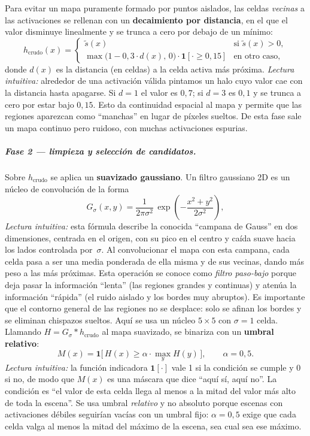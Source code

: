 \documentclass[11pt,fleqn,openany]{book} %
\begin{document}
Para evitar un mapa puramente formado por puntos aislados, las celdas \emph{vecinas} a las activaciones se rellenan con un \textbf{decaimiento por distancia}, en el que el valor disminuye linealmente y se trunca a cero por debajo de un mínimo:
%
\begin{equation}
h_{\text{crudo}}(x) =
\begin{cases}
\tilde s(x) & \text{si } \tilde s(x) > 0,\\
\max\bigl(1 - 0{,}3 \cdot d(x),\,0\bigr) \cdot \mathbf{1}[\cdot \geq 0{,}15] & \text{en otro caso,}
\end{cases}
\label{eq:dist_decay}
\end{equation}
%
donde $d(x)$ es la distancia (en celdas) a la celda activa más próxima. \emph{Lectura intuitiva:} alrededor de una activación válida pintamos un halo cuyo valor cae con la distancia hasta apagarse. Si $d=1$ el valor es $0{,}7$; si $d=3$ es $0{,}1$ y se trunca a cero por estar bajo $0{,}15$. Esto da continuidad espacial al mapa y permite que las regiones aparezcan como ``manchas'' en lugar de píxeles sueltos. De esta fase sale un mapa continuo pero ruidoso, con muchas activaciones espurias.

\subparagraph{Fase 2 — limpieza y selección de candidatos.} Sobre $h_{\text{crudo}}$ se aplica un \textbf{suavizado gaussiano}. Un filtro gaussiano 2D es un núcleo de convolución de la forma
%
\begin{equation}
G_\sigma(x,y) = \frac{1}{2\pi\sigma^{2}}\,
\exp\!\left(-\frac{x^{2}+y^{2}}{2\sigma^{2}}\right),
\label{eq:gauss}
\end{equation}
%
\emph{Lectura intuitiva:} esta fórmula describe la conocida ``campana de Gauss'' en dos dimensiones, centrada en el origen, con su pico en el centro y caída suave hacia los lados controlada por~$\sigma$. Al convolucionar el mapa con esta campana, cada celda pasa a ser una media ponderada de ella misma y de sus vecinas, dando más peso a las más próximas. Esta operación se conoce como \emph{filtro paso-bajo} porque deja pasar la información ``lenta'' (las regiones grandes y continuas) y atenúa la información ``rápida'' (el ruido aislado y los bordes muy abruptos). Es importante que el contorno general de las regiones no se desplace: solo se afinan los bordes y se eliminan chispazos sueltos. Aquí se usa un núcleo $5\times 5$ con $\sigma=1$ celda. Llamando $H = G_\sigma * h_{\text{crudo}}$ al mapa suavizado, se binariza con un \textbf{umbral relativo}:
%
\begin{equation}
M(x) = \mathbf{1}\bigl[\,H(x) \geq \alpha\cdot\max_{y} H(y)\,\bigr],
\qquad \alpha = 0{,}5.
\label{eq:rel_threshold}
\end{equation}
%
\emph{Lectura intuitiva:} la función indicadora $\mathbf{1}[\cdot]$ vale 1 si la condición se cumple y 0 si no, de modo que $M(x)$ es una máscara que dice ``aquí sí, aquí no''. La condición es ``el valor de esta celda llega al menos a la mitad del valor más alto de toda la escena''. Se usa umbral \emph{relativo} y no absoluto porque escenas con activaciones débiles seguirían vacías con un umbral fijo: $\alpha = 0{,}5$ exige que cada celda valga al menos la mitad del máximo de la escena, sea cual sea ese máximo.
\end{document}
